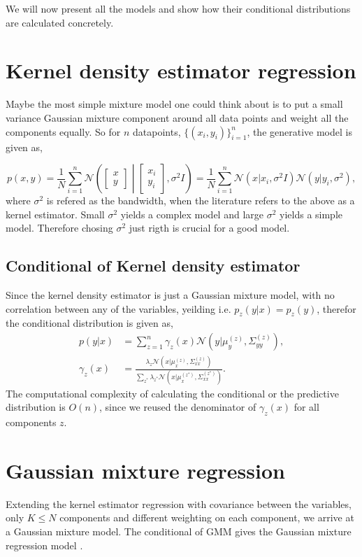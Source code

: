 We will now present all the models and show how their conditional distributions are calculated concretely.

\section{Kernel density estimator regression}
Maybe the most simple mixture model one could think about is to put a small variance Gaussian mixture
component around all data points and weight all the components equally. So for $n$ datapoints,
$\{(x_i,y_i)\}_{i=1}^n$, the generative model is given as, 

$$p(x,y) = \frac{1}{N} \sum_{i=1}^n \mathcal{N}\left(\begin{bmatrix}x\\y\end{bmatrix} \middle|
\begin{bmatrix}x_i\\y_i\end{bmatrix}, \sigma^2 I \right) = \frac{1}{N} \sum_{i=1}^n 
\mathcal{N}(x|x_i, \sigma^2 I)\mathcal{N}(y|y_i, \sigma^2),$$
where $\sigma^2$ is refered as the bandwidth, when the literature refers to the above as a kernel estimator. 
Small $\sigma^2$ yields a complex model and large $\sigma^2$ yields a simple model. Therefore chosing $\sigma^2$
just rigth is crucial for a good model. 


\subsection{Conditional of Kernel density estimator}
Since the kernel density estimator is just a Gaussian mixture model, with no correlation between
any of the variables, yeilding i.e. $p_z(y|x) = p_z(y)$, therefor the conditional distribution is
given as, 
\begin{align}
    p(y|x) &= \sum_{z=1}^n \gamma_z(x) \mathcal{N}(y|\mu_{y}^{(z)},\Sigma_{yy}^{(z)} ),\\
    \gamma_z(x) &= \frac{\lambda_z \mathcal{N}(x|\mu_{x}^{(z)},\Sigma_{xx}^{(z)})}{\sum_{z^*}
\lambda_{z^*} \mathcal{N}(x|\mu_{x}^{(z^*)},\Sigma_{xx}^{(z^*)})}.
\end{align}
The computational complexity of calculating the conditional or the predictive distribution is
$O(n)$, since we reused the denominator of $\gamma_z(x)$ for all components $z$. 

\section{Gaussian mixture regression}
Extending the kernel estimator regression with covariance between the variables, only $K \leq N$ components 
and different weighting on each component, we arrive at a Gaussian mixture model. The conditional of GMM 
gives the Gaussian mixture regression model \cite{GMR}. 

